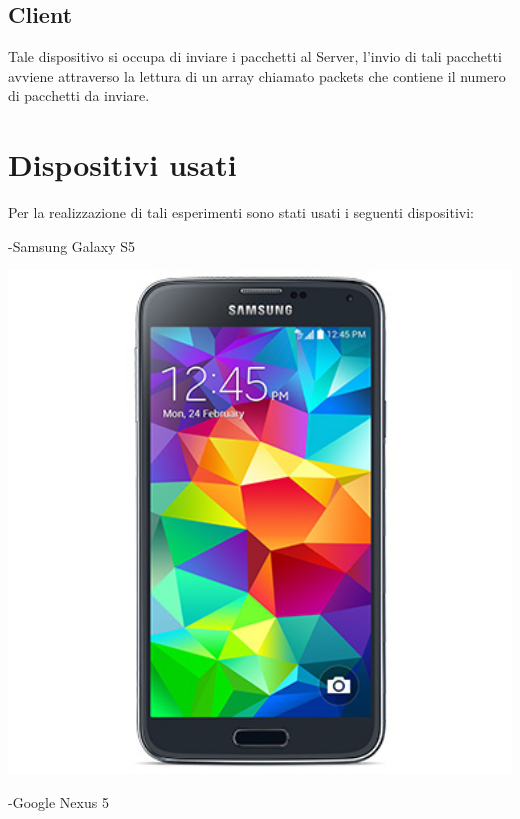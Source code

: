 \subsection{Client}
Tale dispositivo si occupa di inviare i pacchetti al Server, l'invio di tali pacchetti avviene attraverso la lettura di un array chiamato packets che contiene il numero di pacchetti da inviare.


\section{Dispositivi usati}
Per la realizzazione di tali esperimenti sono stati usati i seguenti dispositivi:

-Samsung Galaxy S5

\begin{center}
\includegraphics[width=1\textwidth]{imgs/s5.jpg}
\label{s5_img}%
\end{center}

-Google Nexus 5

